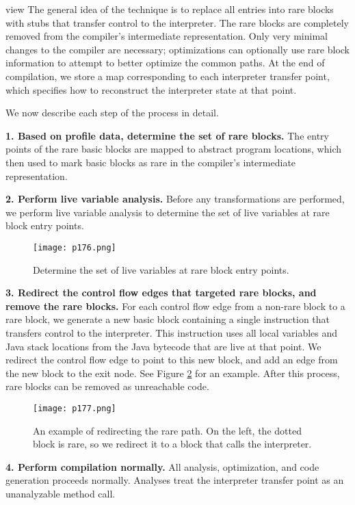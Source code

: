 view
The general idea of the technique is to replace all entries
into rare blocks with stubs that transfer control to the interpreter. The rare blocks are completely removed from the
compiler’s intermediate representation. Only very minimal
changes to the compiler are necessary; optimizations can
optionally use rare block information to attempt to better
optimize the common paths. At the end of compilation, we
store a map corresponding to each interpreter transfer point,
which specifies how to reconstruct the interpreter state at
that point.


We now describe each step of the process in detail.


\textbf{1. Based on profile data, determine the set of rare
	blocks.}
The entry points of the rare basic blocks
are mapped to abstract program locations, which then used to mark basic blocks as rare in the compiler’s
intermediate representation.

\textbf{2. Perform live variable analysis.}
Before any transformations are performed, we perform
live variable analysis to determine the set of live variables at rare block entry points.

\begin{figure}[H]
	\centering
	\texttt{[image: p176.png]}
	\caption{Determine the set of live variables at rare block entry points.}
	\label{fig:p176}
\end{figure}

\textbf{3. Redirect the control flow edges that targeted
	rare blocks, and remove the rare blocks.}
For each control flow edge from a non-rare block to a
rare block, we generate a new basic block containing
a single instruction that transfers control to the interpreter. This instruction uses all local variables and
Java stack locations from the Java bytecode that are
live at that point. We redirect the control flow edge
to point to this new block, and add an edge from the
new block to the exit node. See Figure \ref{fig:p177} for an example. After this process, rare blocks can be removed
as unreachable code.


\begin{figure}[H]
	\centering
	\texttt{[image: p177.png]}
	\caption{An example of redirecting the rare path.
		On the left, the dotted block is rare, so we redirect
		it to a block that calls the interpreter.}
	\label{fig:p177}
\end{figure}

\textbf{4. Perform compilation normally.}
All analysis, optimization, and code generation proceeds normally. Analyses treat the interpreter transfer
point as an unanalyzable method call.

